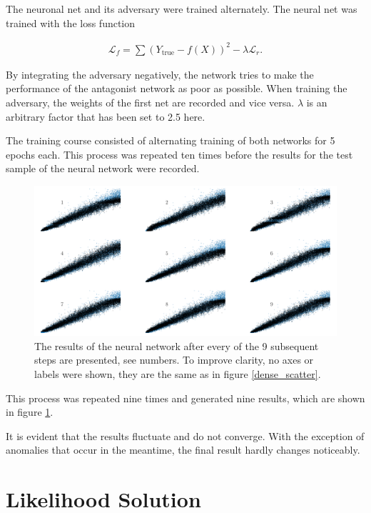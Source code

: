 \documentclass[12pt, a4paper]{thesis}
\begin{document}
The neuronal net and its adversary were trained alternately. The
neural net was trained with the loss function

\begin{align}
\mathcal{L}_f = \sum (Y_{\text{true}} - f(X))^2 - \lambda
\mathcal{L}_r.
\end{align}

By integrating the adversary negatively, the network tries to make the
performance of the antagonist network as poor as possible. When
training the adversary, the weights of the first net are recorded and
vice versa. \(\lambda\) is an arbitrary factor that has been set to 2.5
here. 

The training course consisted of alternating training of both networks
for 5 epochs each. This process was repeated ten times before the
results for the test sample of the neural network were recorded.

\begin{figure}[H]
\centering
\includegraphics[width=.9\linewidth]{../images/adv_scatter.png}
\caption{ The results of the neural network after every of the 9
  subsequent steps are presented, see numbers. To improve clarity, no
  axes or labels were shown, they are the same as in figure
  \ref{dense_scatter}.}
\label{adv_scatter}
\end{figure}

This process was repeated nine times and generated nine results, which
are shown in figure \ref{adv_scatter}.

It is evident that the results fluctuate and do not converge. With
the exception of anomalies that occur in the meantime, the final
result hardly changes noticeably.

\section{Likelihood Solution}
\label{sec:org05c2ceb}
\end{document}
